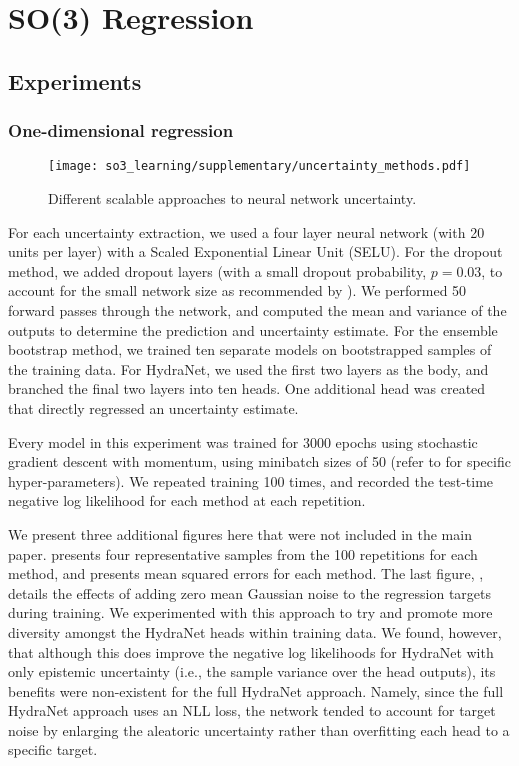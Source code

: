 \chapter{SO(3) Regression}
\label{chap:appendix_so3_learning}

\section{Experiments}
\subsection{One-dimensional regression}

\begin{figure*}
	\centering
	\texttt{[image: so3\_learning/supplementary/uncertainty\_methods.pdf]}
	\vspace{-.5em}
	\caption{Different scalable approaches to neural network uncertainty. }
	\label{fig:nn-uncertainty}
\end{figure*}

For each uncertainty extraction, we used a four layer neural network (with 20 units per layer) with a Scaled Exponential Linear Unit (SELU). For the dropout method, we added dropout layers (with a small dropout probability, $p=0.03$, to account for the small network size as recommended by \cite{Gal2016-ny}). We performed 50 forward passes through the network, and computed the mean and variance of the outputs to determine the prediction and uncertainty estimate. For the ensemble bootstrap method, we trained ten separate models on bootstrapped samples of the training data. For HydraNet, we used the first two layers as the body, and branched the final two layers into ten heads.  One additional head was created that directly regressed an uncertainty estimate.  


Every model in this experiment was trained for 3000 epochs using stochastic gradient descent with momentum, using minibatch sizes of 50 (refer to  for specific hyper-parameters). We repeated training 100 times, and recorded the test-time negative log likelihood for each method at each repetition.


We present three additional figures here that were not included in the main paper.  presents four representative samples from the 100 repetitions for each method, and  presents mean squared errors for each method. The last figure, , details the effects of adding zero mean Gaussian noise to the regression targets during training. We experimented with this approach to try and promote more diversity amongst the HydraNet heads within training data. We found, however, that although this does improve the negative log likelihoods for HydraNet with only epistemic uncertainty (i.e., the sample variance over the head outputs), its benefits were non-existent for the full HydraNet approach. Namely, since the full HydraNet approach uses an NLL loss, the network tended to account for target noise by enlarging the aleatoric uncertainty rather than overfitting each head to a specific target.


